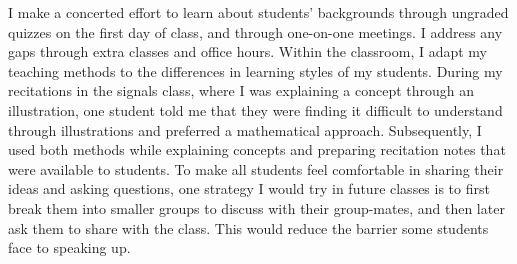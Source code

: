 \documentclass[10pt]{article}
\begin{document}
I make a concerted effort to learn about students' backgrounds through ungraded quizzes on the first day of class, and through one-on-one meetings. I address any gaps through extra classes and office hours. %
Within the  classroom, I adapt my teaching methods to the differences in learning styles of my students. %
During my recitations in the signals class, where I was explaining a concept through an illustration, one student told me that they were finding it difficult to understand through illustrations and preferred a mathematical approach. Subsequently, I used both methods while explaining concepts and preparing recitation notes that were available to students. %
To make all students feel comfortable in sharing their ideas and asking questions, one strategy I would try in future classes is to first break them into smaller groups to discuss with their group-mates, and then later ask them to share with the class. This would reduce the barrier some students face to speaking up. %
\end{document}
